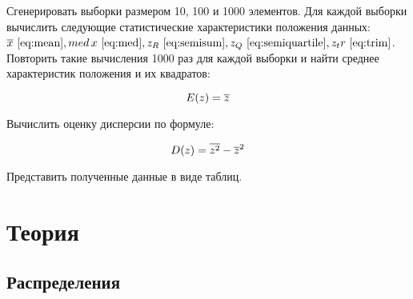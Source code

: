 \documentclass[12pt,a4paper]{scrartcl}
\begin{document}
Сгенерировать выборки размером 10, 100 и 1000 элементов.
Для каждой выборки вычислить следующие статистические характеристики положения данных:
$\overline x ~\eqref{eq:mean}, med\, x~\eqref{eq:med}, z_R ~\eqref{eq:semisum}, z_Q ~\eqref{eq:semiquartile}, z_tr~\eqref{eq:trim}$. Повторить такие
вычисления 1000 раз для каждой выборки и найти среднее характеристик положения и их квадратов:

\begin{equation}\label{eq:expectation}
\centering
 E(z) = \overline z
\end{equation}

Вычислить оценку дисперсии по формуле:

\begin{equation}\label{eq:dispertion}
\centering
 D(z) = \overline {z^2} - \overline z^2
\end{equation}

Представить полученные данные в виде таблиц.

\section{Теория}
\subsection{Распределения}
\end{document}
